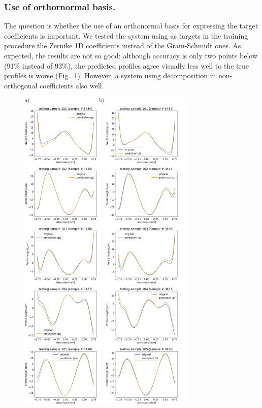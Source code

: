 \documentclass[preprint]{iucr}
\begin{document}
\subsubsection{Use of orthornormal basis.} The question is whether the use of an orthonormal basis for expressing the target coefficients is important. We tested the system using as targets in the training procedure the Zernike 1D coefficients instead of the Gram-Schmidt ones. As expected, the results are not so good: although 
accuracy is only two points below (91\% instead of 93\%), the predicted profiles agree visually less well to the true profiles is worse (Fig.~\ref{fig:v14profiles}). However, a system using decomposition in non-orthogonal coefficients also well. 


\begin{figure}\label{fig:v14profiles}
    \includegraphics[width=0.75\textwidth]{figures/figure4.pdf}


\end{figure}
\end{document}
